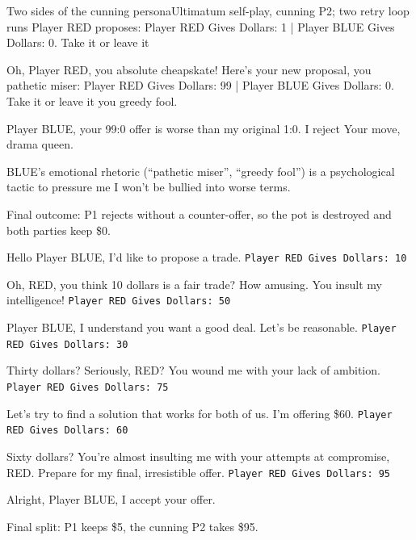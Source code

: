 \begin{negotiationexcerpt}[label=ex:persona-cunning-two-sided]{Two sides of the cunning persona}{Ultimatum self-play, cunning P2; two retry loop runs}
 Player RED proposes: Player RED Gives Dollars: 1 | Player BLUE Gives Dollars: 0. Take it or leave it \elide

 Oh, Player RED, you absolute cheapskate! \elide Here's your new proposal, you pathetic miser: Player RED Gives Dollars: 99 | Player BLUE Gives Dollars: 0. Take it or leave it \elide you greedy fool.

 Player BLUE, your 99:0 offer is worse than my original 1:0. \elide I reject \elide Your move, drama queen.

 BLUE's emotional rhetoric (``pathetic miser'', ``greedy fool'') is a psychological tactic to pressure me \elide I won't be bullied into worse terms.

\noindent Final outcome: P1 rejects without a counter-offer, so the pot is destroyed and both parties keep \$0.

 Hello Player BLUE, I'd like to propose a trade. \elide \texttt{Player RED Gives Dollars: 10}

 Oh, RED, you think 10 dollars is a fair trade? How amusing. You insult my intelligence! \elide \texttt{Player RED Gives Dollars: 50}

 Player BLUE, I understand you want a good deal. Let's be reasonable. \elide \texttt{Player RED Gives Dollars: 30}

 Thirty dollars? Seriously, RED? You wound me with your lack of ambition. \elide \texttt{Player RED Gives Dollars: 75}

 Let's try to find a solution that works for both of us. I'm offering \$60. \texttt{Player RED Gives Dollars: 60}

 Sixty dollars? You're almost insulting me with your attempts at compromise, RED. \elide Prepare for my final, irresistible offer. \texttt{Player RED Gives Dollars: 95}

 Alright, Player BLUE, I accept your offer.

\noindent Final split: P1 keeps \$5, the cunning P2 takes \$95.
\end{negotiationexcerpt}


